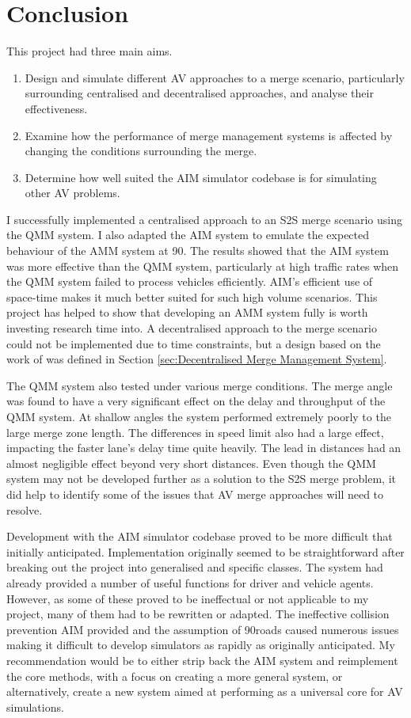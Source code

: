 \chapter{Conclusion}
\label{cha:Conclusion}
This project had three main aims.
\begin{enumerate}
\item Design and simulate different AV approaches to a merge scenario, particularly surrounding centralised and decentralised approaches, and analyse their effectiveness.
\item Examine how the performance of merge management systems is affected by changing the conditions surrounding the merge.
\item Determine how well suited the AIM simulator codebase is for simulating other AV problems.
\end{enumerate}

I successfully implemented a centralised approach to an S2S merge scenario using the QMM system. I also adapted the AIM system to emulate the expected behaviour of the AMM system at 90\degree. The results showed that the AIM system was more effective than the QMM system, particularly at high traffic rates when the QMM system failed to process vehicles efficiently. AIM's efficient use of space-time makes it much better suited for such high volume scenarios. This project has helped to show that developing an AMM system fully is worth investing research time into. A decentralised approach to the merge scenario could not be implemented due to time constraints, but a design based on the work of \citep{VanMiddlesworth2008} was defined in Section \ref{sec:Decentralised Merge Management System}.

The QMM system also tested under various merge conditions. The merge angle was found to have a very significant effect on the delay and throughput of the QMM system. At shallow angles the system performed extremely poorly to the large merge zone length. The differences in speed limit also had a large effect, impacting the faster lane's delay time quite heavily. The lead in distances had an almost negligible effect beyond very short distances. Even though the QMM system may not be developed further as a solution to the S2S merge problem, it did help to identify some of the issues that AV merge approaches will need to resolve.

Development with the AIM simulator codebase proved to be more difficult that initially anticipated. Implementation originally seemed to be straightforward after breaking out the project into generalised and specific classes. The system had already provided a number of useful functions for driver and vehicle agents. However, as some of these proved to be ineffectual or not applicable to my project, many of them had to be rewritten or adapted. The ineffective collision prevention AIM provided and the assumption of 90\degree roads caused numerous issues making it difficult to develop simulators as rapidly as originally anticipated. My recommendation would be to either strip back the AIM system and reimplement the core methods, with a focus on creating a more general system, or alternatively, create a new system aimed at performing as a universal core for AV simulations.

